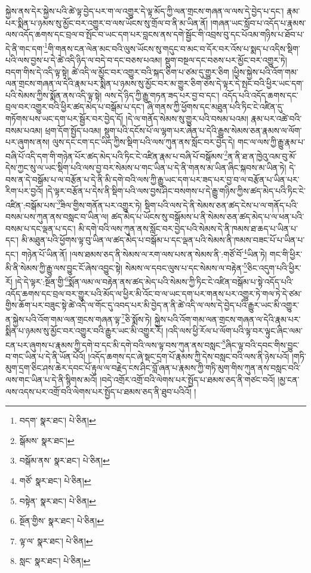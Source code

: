 སྐྱེས་ནས་དེར་སྐྱེས་པའི་ཚེ་ལྟ་བྱེད་པར་ག་ལ་འགྱུར་དེ་ལྟ་མོད་ཀྱི་ལན་གྲངས་གཞན་ལ་ལས་དེ་བྱེད་པ་དང་། རྣམ་པར་སྨིན་པ་ཉམས་སུ་མྱོང་བར་འགྱུར་བ་ལས་ཡོངས་སུ་གྲོལ་བ་ནི་མ་ཡིན་ནོ། །གཞན་ཡང་སློབ་པ་འདོད་པ་རྣམས་ལས་འདོད་ཆགས་དང་བྲལ་བ་སྤོང་བ་ཡང་དག་པར་བླངས་ནས་དགེ་སྦྱོང་གི་འབྲས་བུ་དང་པོའམ་གཉིས་པ་ཐོབ་པ་དེ་ནི་གང་དག་\footnote{བདག་  སྣར་ཐང་།  པེ་ཅིན། }གི་གནས་ངན་ལེན་མང་བའི་ལུས་ཡོངས་སུ་གདུང་བ་མང་བ་དོར་བར་འོས་པ་སྨད་པ་འདིས་སྡིག་པའི་ལས་བྱས་པ་དེ་ཚེ་འདི་ཉིད་ལ་བདེ་བ་དང་བཅས་པའམ། སྡུག་བསྔལ་དང་བཅས་པར་མྱོང་བར་འགྱུར་ཏེ། བདག་གིས་དེ་འདི་ལྟ་སྟེ། ཚེ་འདི་ལ་མྱོང་བར་འགྱུར་བའི་སྐད་ཅིག་པ་ཙམ་དུ་གྱུར་ཅིག །ཕྱིས་སྐྱེས་པའི་འོག་གམ་ལན་གྲངས་གཞན་ལ་དེའི་རྣམ་པར་སྨིན་པ་ཉམས་སུ་མྱོང་བར་མ་གྱུར་ཅིག་ཅེས་དེ་ལྟར་དེ་སྤང་བའི་ཕྱིར་ཡང་དག་པའི་སེམས་ཀྱིས་སྨོན་ནས་འདི་ལྟ་སྟེ། ལས་དེ་ཉིད་ཀྱི་རྒྱུ་གཏན་ཟད་པར་བྱ་བ་དང་། འདོད་པའི་འདོད་ཆགས་དང་བྲལ་བར་འགྱུར་བའི་ཕྱིར་ཚད་མེད་པ་བསྒོམ་པ་དང་། ཞི་གནས་ཀྱི་ཕྱོགས་དང་མཐུན་པའི་ཏིང་ངེ་འཛིན་དུ་གཏོགས་པས་ཡང་དག་པར་སྦྱོར་བར་བྱེད་དོ། །དེ་ལ་གནོད་སེམས་སུ་གྱུར་པའི་བསམ་པའམ། རྣམ་པར་འཚེ་བའི་བསམ་པའམ། ཕྲག་དོག་སྤྱོད་པའམ། སྡུག་པའི་དངོས་པོ་ལ་ལྷག་པར་ཞེན་པ་དེའི་རྒྱུས་སེམས་ཅན་རྣམས་ལ་ལོག་པར་ཞུགས་ནས། ལུས་དང་ངག་དང་ཡིད་ཀྱིས་སྡིག་པའི་ལས་ཀུན་ནས་སློང་བར་བྱེད་དེ། གང་ལ་ལས་ཀྱི་རྒྱུ་རྣམ་པ་བཞི་པོ་འདི་དག་གི་གཉེན་པོར་ཚད་མེད་པའི་ཏིང་ངེ་འཛིན་རྣམ་པ་བཞི་པོ་བསྒོམས་\footnote{སྒོམས་  སྣར་ཐང་། }ན་ནི་ཐ་ན་ཁྱེའུ་འམ་བུ་མོ་དེས་ཀྱང་སུ་ལ་ཡང་སྡིག་པའི་ལས་བྱ་བར་སེམས་པ་གང་ཡིན་པ་དེ་ནི་གནས་མ་ཡིན་ཞིང་སྐབས་མ་ཡིན་ཏེ། དེ་བས་ན་དེ་བསྒོམ་པ་ལ་བརྩོན་པ་དེ་ནི་མི་དགེ་བའི་ལས་ཀྱི་རྒྱུ་ཡང་དག་པར་ཟད་པར་བྱ་བ་ལ་བརྩོན་པ་ཡིན་པར་རིག་པར་བྱའོ། །དེ་ལྟར་བརྩོན་པ་དེས་ནི་སྡིག་པའི་ལས་བྱས་ཤིང་བསགས་པ་དེ་རྒྱུ་གཉིས་ཀྱིས་ཚད་མེད་པའི་ཏིང་ངེ་འཛིན་:བསྒོམ་པས་\footnote{བསྒོམ་ནས་  སྣར་ཐང་།  པེ་ཅིན། }ཟིལ་གྱིས་གནོན་པར་འགྱུར་ཏེ། སྡིག་པའི་ལས་དེ་ནི་སེམས་ཅན་ཚད་ངེས་པ་ལ་གནོད་པའི་བསམ་པས་ཀུན་ནས་བསླང་བ་ཡིན་ལ། ཚད་མེད་པ་ཡོངས་སུ་བསྒོམས་པ་ནི་སེམས་ཅན་ཚད་མེད་པ་ལ་ཕན་པའི་བསམ་པ་དང་ལྡན་པ་དང་། མི་དགེ་བའི་ལས་ཀུན་ནས་སློང་བར་བྱེད་པའི་སེམས་དེ་ནི་ཁམས་ཐ་ཆད་པ་ཡིན་པ་དང་། མི་མཐུན་པའི་ཕྱོགས་ལྟ་བུ་ཡིན་ལ་ཚད་མེད་པ་བསྒོམ་པ་དང་ལྡན་པའི་སེམས་ནི་ཁམས་བཟང་པོ་པ་ཡིན་པ་དང་། གཉེན་པོ་ཡིན་ནོ། །ལས་ཐམས་ཅད་ནི་སེམས་ལ་རག་ལས་པས་ན་སེམས་ནི་:གཙོ་བོ་\footnote{གཙོ་  སྣར་ཐང་།  པེ་ཅིན། }ཡིན་ཏེ། གང་གི་ཕྱིར་མི་ནི་སེམས་ཀྱི་རྒྱུ་ལས་བྱུང་ངོ་ཞེས་འབྱུང་སྟེ། སེམས་ལ་དབང་ལུས་པ་དང་སེམས་ལ་བརྟེན་\footnote{བསྟེན་  སྣར་ཐང་།  པེ་ཅིན། }ཅིང་འདུག་པའི་ཕྱིར་རོ། །དེ་དེ་ལྟར་:སྔོན་གྱི་\footnote{སྔོན་གྱིས་  སྣར་ཐང་།  པེ་ཅིན། }སྨོན་ལམ་ལ་བརྟེན་ནས་ཚད་མེད་པའི་སེམས་ཀྱི་ཏིང་ངེ་འཛིན་བསྒོམ་པ་སྟེ་འདོད་པའི་འདོད་ཆགས་དང་བྲལ་བར་གྱུར་པའི་མོད་ལ་ཕྱིར་མི་འོང་བ་ལ་ཡང་དག་པར་གནས་པར་འགྱུར་ཏེ་གལ་ཏེ་དེ་ཙམ་གྱིས་ཆོག་པར་བཟུང་སྟེ་ཚེ་འདི་ལ་གོང་དུ་འབད་པར་མི་བྱེད་ན་ནི་ཚེ་འདི་ལ་ལས་དེ་བྱེད་པའི་རྒྱུར་ཡང་མི་འགྱུར་ན་སྐྱེས་པའི་འོག་གམ་ལན་གྲངས་གཞན་ལྟ་\footnote{ལྟ་ལ་  སྣར་ཐང་།  པེ་ཅིན། }ཅི་སྨོས་ཏེ། སྐྱེས་པའི་འོག་གམ་ལན་གྲངས་གཞན་ལ་དེའི་རྣམ་པར་སྨིན་པ་ཉམས་སུ་མྱོང་བར་འགྱུར་བའི་རྒྱུར་ཡང་མི་འགྱུར་རོ། །འདི་ལས་ཕྱི་རོལ་པ་ལོག་པའི་ལྟ་བར་ལྟུང་ཞིང་ལམ་ངན་པར་ཞུགས་པ་རྣམས་ཀྱི་དགེ་བ་དང་མི་དགེ་བའི་ལས་ལྟ་བས་ཀུན་ནས་བསླང་\footnote{སླང་  སྣར་ཐང་།  པེ་ཅིན། }ཞིང་ལྟ་བའི་དབང་གིས་བྱུང་བ་གང་ཡིན་པ་དེ་ནི་ཡོན་པོའོ། །འདོད་ཆགས་དང་ཞེ་སྡང་དྲག་པོ་རྣམས་ཀྱི་དེས་བསླང་བའི་ལས་ནི་ཉེས་པའོ། །གཏི་མུག་དྲག་ཅིང་ཤས་ཆེར་དབང་པོ་རྟུལ་ལ་བརྗེད་ངས་ཤིང་བློ་ཞན་པ་རྣམས་ཀྱི་གཏི་མུག་གིས་ཀུན་ནས་བསླང་བའི་ལས་གང་ཡིན་པ་དེ་ནི་སྙིགས་མའོ། །བདེ་འགྲོར་འགྲོ་བའི་ལེགས་པར་སྤྱོད་པ་ཐམས་ཅད་ནི་གཙང་བའོ། །མྱ་ངན་ལས་འདས་པར་འགྲོ་བའི་ལེགས་པར་སྤྱོད་པ་ཐམས་ཅད་ནི་ཐུབ་པའིའོ། །
